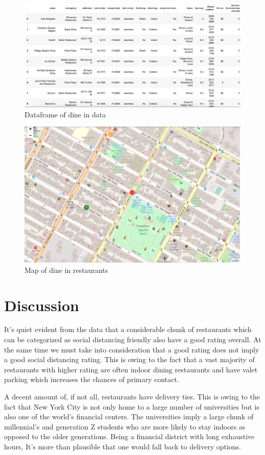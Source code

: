 \documentclass[11pt]{report}
\begin{document}
\begin{figure}[ht]
  \includegraphics[width =\columnwidth]{east-village-dinein-data.png}
  \caption{Dataframe of dine in data}
  \label{df_dinein}
\end{figure}

\begin{figure}[ht]
  \includegraphics[width =\columnwidth]{east-village-dinein-map.png}
  \caption{Map of dine in restaurants}
  \label{map_dinein}
\end{figure}

\chapter{Discussion}
\par It's quiet evident from the data that a considerable chunk of restaurants which can be categorized as social distancing friendly also have a good rating overall. At the same time we must take into consideration that a good rating does not imply a good social distancing rating. This is owing to the fact that a vast majority of restaurants with higher rating are often indoor dining restaurants and have valet parking which increases the chances of primary contact. 
\par A decent amount of, if not all, restaurants have delivery ties. This is owing to the fact that New York City is not only home to a large number of universities but is also one of the world's financial centers. The universities imply a large chunk of millennial's and generation Z students who are more likely to stay indoors as opposed to the older generations. Being a financial district with long exhaustive hours, It's more than plausible that one would fall back to delivery options. 
\end{document}
